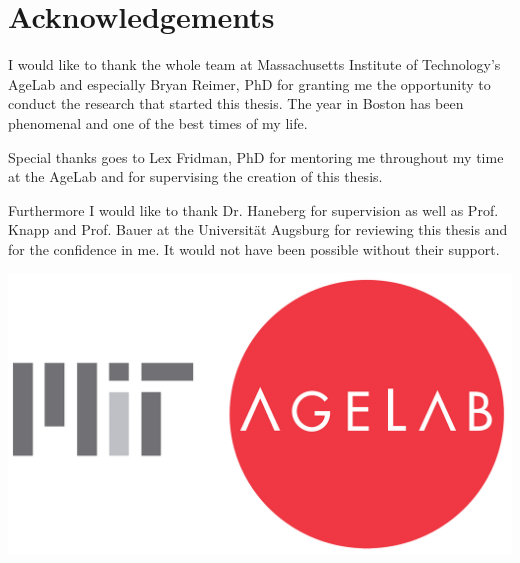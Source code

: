 \chapter*{Acknowledgements}
\label{acknowledgements}


I would like to thank the whole team at Massachusetts Institute of Technology's AgeLab and especially Bryan Reimer, PhD for granting me the opportunity to conduct the research that started this thesis. The year in Boston has been phenomenal and one of the best times of my life.

Special thanks goes to Lex Fridman, PhD for mentoring me throughout my time at the AgeLab and for supervising the creation of this thesis. %

Furthermore I would like to thank Dr. Haneberg for supervision as well as Prof. Knapp and Prof. Bauer at the Universität Augsburg for reviewing this thesis and for the confidence in me. It would not have been possible without their support.


\vspace{2.5cm}
\begin{center}
	\includegraphics[width=.6\textwidth]{./images/logos/agelab}
\end{center}
